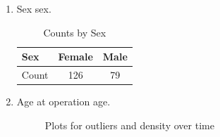 \begin{enumerate}
\item Sex sex.\\
\begin{table}[h!]
    \centering
    \begin{tabular}{|l|c|c|}
        \hline
        Sex & Female & Male \\
        \hline
        Count & 126 & 79 \\
        \hline
    \end{tabular}
    \caption{Counts by Sex}
    \label{tab:sex}
\end{table}
\newpage
\item Age at operation age.
\newline
\begin{figure}[h]
    \centering
 \hfill
  \hfill
  \caption{Plots for outliers and density over time}
\end{figure}


\end{enumerate}
